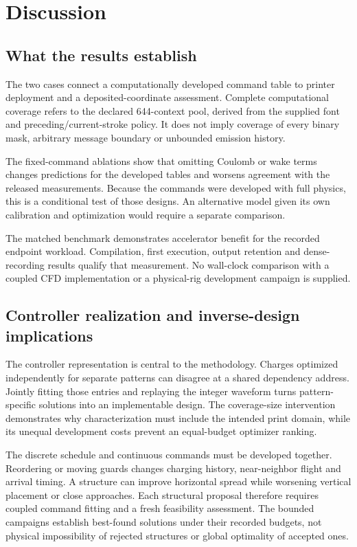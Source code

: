 \section{Discussion}
\subsection{What the results establish}
The two cases connect a computationally developed command table to printer deployment and a deposited-coordinate assessment. Complete computational coverage refers to the declared 644-context pool, derived from the supplied font and preceding/current-stroke policy. It does not imply coverage of every binary mask, arbitrary message boundary or unbounded emission history.

The fixed-command ablations show that omitting Coulomb or wake terms changes predictions for the developed tables and worsens agreement with the released measurements. Because the commands were developed with full physics, this is a conditional test of those designs. An alternative model given its own calibration and optimization would require a separate comparison.

The matched benchmark demonstrates accelerator benefit for the recorded endpoint workload. Compilation, first execution, output retention and dense-recording results qualify that measurement. No wall-clock comparison with a coupled CFD implementation or a physical-rig development campaign is supplied.

\subsection{Controller realization and inverse-design implications}
The controller representation is central to the methodology. Charges optimized independently for separate patterns can disagree at a shared dependency address. Jointly fitting those entries and replaying the integer waveform turns pattern-specific solutions into an implementable design. The coverage-size intervention demonstrates why characterization must include the intended print domain, while its unequal development costs prevent an equal-budget optimizer ranking.

The discrete schedule and continuous commands must be developed together. Reordering or moving guards changes charging history, near-neighbor flight and arrival timing. A structure can improve horizontal spread while worsening vertical placement or close approaches. Each structural proposal therefore requires coupled command fitting and a fresh feasibility assessment. The bounded campaigns establish best-found solutions under their recorded budgets, not physical impossibility of rejected structures or global optimality of accepted ones.


